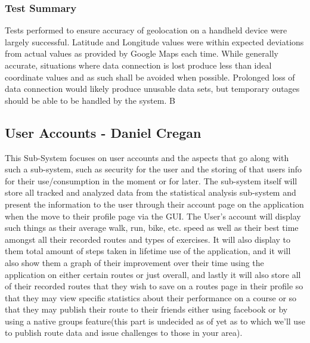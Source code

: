 ﻿\documentclass{article}
\begin{document}
\subsubsection{Test Summary}
Tests performed to ensure accuracy of geolocation on a handheld device were largely successful. Latitude and Longitude values were within expected deviations from actual values as provided by Google Maps each time. While generally accurate, situations where data connection is lost produce less than ideal coordinate values and as such shall be avoided when possible. Prolonged loss of data connection would likely produce unusable data sets, but temporary outages should be able to be handled by the system.
B
\pagebreak

\subsection{User Accounts - Daniel Cregan}
This Sub-System focuses on user accounts and the aspects that go along with such a sub-system, such as security for the user and the storing of that users info for their use/consumption in the moment or for later.
The sub-system itself will store all tracked and analyzed data from the statistical analysis sub-system and present the information to the user through their account page on the application when the move to their profile page via the GUI. The User's account will display such things as their average walk, run, bike, etc. speed as well as their best time amongst all their recorded routes and types of exercises. It will also display to them total amount of steps taken in lifetime use of the application, and it will also show them a graph of their improvement over their time using the application on either certain routes or just overall, and lastly it will also store all of their recorded routes that they wish to save on a routes page in their profile so that they may view specific statistics about their performance on a course or so that they may publish their route to their friends either using facebook or by using a native groups feature(this part is undecided as of yet as to which we’ll use to publish route data and issue challenges to those in your area).
\end{document}
